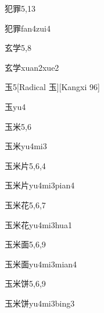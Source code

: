 \begin{entry}{犯罪}{5,13}
  \begin{phonetics}{犯罪}{fan4zui4}
  \end{phonetics}
\end{entry}

\begin{entry}{玄学}{5,8}
  \begin{phonetics}{玄学}{xuan2xue2}
  \end{phonetics}
\end{entry}

\begin{entry}{玉}{5}[Radical 玉][Kangxi 96]
  \begin{phonetics}{玉}{yu4}
  \end{phonetics}
\end{entry}

\begin{entry}{玉米}{5,6}
  \begin{phonetics}{玉米}{yu4mi3}
  \end{phonetics}
\end{entry}

\begin{entry}{玉米片}{5,6,4}
  \begin{phonetics}{玉米片}{yu4mi3pian4}
  \end{phonetics}
\end{entry}

\begin{entry}{玉米花}{5,6,7}
  \begin{phonetics}{玉米花}{yu4mi3hua1}
  \end{phonetics}
\end{entry}

\begin{entry}{玉米面}{5,6,9}
  \begin{phonetics}{玉米面}{yu4mi3mian4}
  \end{phonetics}
\end{entry}

\begin{entry}{玉米饼}{5,6,9}
  \begin{phonetics}{玉米饼}{yu4mi3bing3}
  \end{phonetics}
\end{entry}

